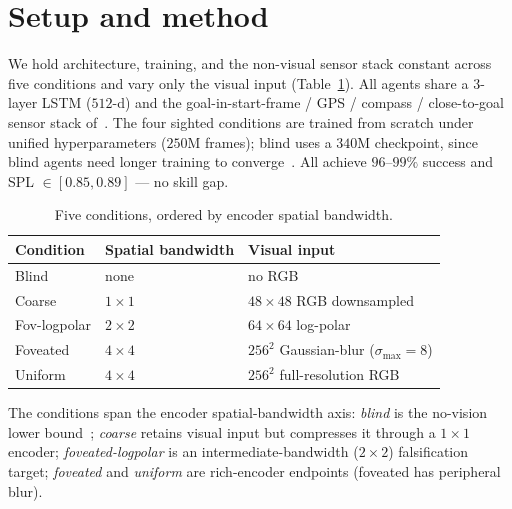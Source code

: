 \documentclass[10pt,conference,compsocconf]{IEEEtran}
\begin{document}
\section{Setup and method}

We hold architecture, training, and the non-visual sensor stack constant across five conditions and vary only the visual input (Table~\ref{tab:conditions}). All agents share a $3$-layer LSTM ($512$-d) and the goal-in-start-frame / GPS / compass / close-to-goal sensor stack of~\cite{wijmans2023emergence}. The four sighted conditions are trained from scratch under unified hyperparameters ($250$M frames); blind uses a $340$M checkpoint, since blind agents need longer training to converge~\cite{tolman1948cognitive,wijmans2023emergence}. All achieve $96$--$99\%$ success and SPL $\in [0.85, 0.89]$ --- no skill gap.

\begin{table}[h]
\centering\footnotesize\vspace{-4pt}
\setlength{\tabcolsep}{4pt}
\caption{Five conditions, ordered by encoder spatial bandwidth.}\vspace{-3pt}
\label{tab:conditions}
\begin{tabular}{@{}lll@{}}
\toprule
\textbf{Condition} & \textbf{Spatial bandwidth} & \textbf{Visual input}\\
\midrule
Blind            & none           & no RGB \\
Coarse           & $1{\times}1$   & $48{\times}48$ RGB downsampled \\
Fov-logpolar     & $2{\times}2$   & $64{\times}64$ log-polar \\
Foveated         & $4{\times}4$   & $256^2$ Gaussian-blur ($\sigma_{\max}{=}8$) \\
Uniform          & $4{\times}4$   & $256^2$ full-resolution RGB \\
\bottomrule
\end{tabular}\vspace{-2pt}
\end{table}

The conditions span the encoder spatial-bandwidth axis: \emph{blind} is the no-vision lower bound~\cite{wijmans2023emergence}; \emph{coarse} retains visual input but compresses it through a $1{\times}1$ encoder; \emph{foveated-logpolar} is an intermediate-bandwidth ($2{\times}2$) falsification target; \emph{foveated} and \emph{uniform} are rich-encoder endpoints (foveated has peripheral blur).
\end{document}
